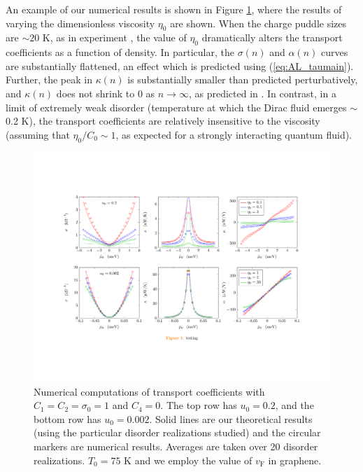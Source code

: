 An example of our numerical results is shown in Figure \ref{fig:AL_viscfig}, where the results of varying the dimensionless viscosity $\eta_0$ are shown.    When the charge puddle sizes are $\sim 20$ K, as in experiment \cite{xue_scanning_2011}, the  value of $\eta_0$ dramatically alters the transport coefficients as a function of density.   In particular, the $\sigma(n)$ and $\alpha(n)$ curves are substantially flattened, an effect which is predicted using (\ref{eq:AL_taumain}).   Further, the peak in $\kappa(n)$ is substantially smaller than predicted perturbatively, and $\kappa(n)$ does not shrink to 0 as $n\rightarrow\infty$, as predicted in \cite{hartnoll_theory_2007}.   In contrast, in a limit of extremely weak disorder (temperature at which the Dirac fluid  emerges $\sim$ 0.2 K),  the transport coefficients are relatively insensitive to the viscosity (assuming that $\eta_0/C_0 \sim 1$, as expected for a strongly interacting quantum fluid).  

\begin{figure}[t]
\centering
\includegraphics[width=\textwidth]{figures/hydro_theory/viscosityplot.pdf}
\caption{Numerical computations of transport coefficients with $C_1=C_2=\sigma_0=1$ and $C_4=0$.   The top row has $u_0=0.2$, and the bottom row has $u_0=0.002$.   Solid lines are our theoretical results (using the particular disorder realizations studied) and the circular markers are numerical results.   Averages are taken over 20 disorder realizations.  $T_0=75$ K and we employ the value of $v_{\mathrm{F}}$ in graphene.  }
\label{fig:AL_viscfig}
\end{figure}

